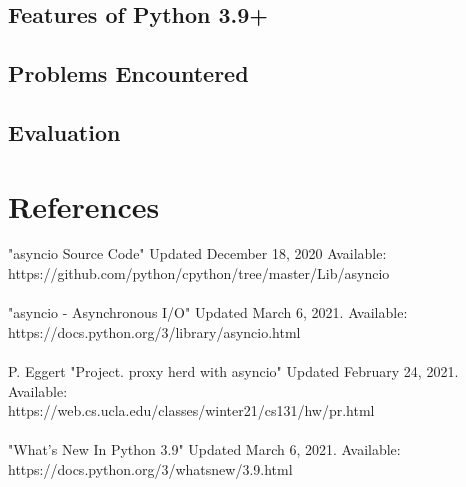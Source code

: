\subsection{Features of Python 3.9+}

\subsection{Problems Encountered}

\subsection{Evaluation}

\section{References}
"asyncio Source Code"
Updated December 18, 2020
Available: \\ https://github.com/python/cpython/tree/master/Lib/asyncio \\
\\
"asyncio - Asynchronous I/O" 
Updated March 6, 2021.
Available: \\ https://docs.python.org/3/library/asyncio.html \\
\\
P. Eggert "Project. proxy herd with asyncio" 
Updated February 24, 2021. 
Available: \\ https://web.cs.ucla.edu/classes/winter21/cs131/hw/pr.html \\
\\
"What's New In Python 3.9"
Updated March 6, 2021.
Available: \\ https://docs.python.org/3/whatsnew/3.9.html





